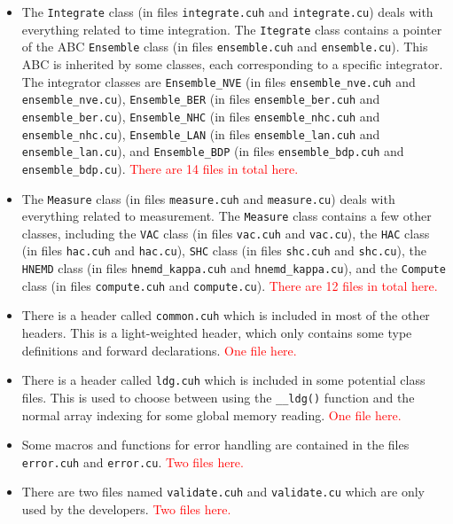 \documentclass[12pt,a4paper]{report}
\begin{document}
\begin{itemize}
\item The \verb"Integrate" class (in files \verb"integrate.cuh" and \verb"integrate.cu") deals with everything related to time integration. The \verb"Itegrate" class contains a pointer of the ABC \verb"Ensemble" class (in files \verb"ensemble.cuh" and \verb"ensemble.cu"). This ABC is inherited by some classes, each corresponding to a specific integrator. The integrator classes are \verb"Ensemble_NVE" (in files \verb"ensemble_nve.cuh" and \verb"ensemble_nve.cu"), \verb"Ensemble_BER" (in files \verb"ensemble_ber.cuh" and \verb"ensemble_ber.cu"), \verb"Ensemble_NHC" (in files \verb"ensemble_nhc.cuh" and \verb"ensemble_nhc.cu"), \verb"Ensemble_LAN" (in files \verb"ensemble_lan.cuh" and \verb"ensemble_lan.cu"), and \verb"Ensemble_BDP" (in files \verb"ensemble_bdp.cuh" and \verb"ensemble_bdp.cu").  \textcolor{red}{There are 14 files in total here.}

\item The \verb"Measure" class (in files \verb"measure.cuh" and \verb"measure.cu") deals with everything related to measurement. The \verb"Measure" class contains a few other classes, including the  \verb"VAC" class (in files \verb"vac.cuh" and \verb"vac.cu"), the \verb"HAC" class (in files \verb"hac.cuh" and \verb"hac.cu"), \verb"SHC" class (in files \verb"shc.cuh" and \verb"shc.cu"), the \verb"HNEMD" class (in files \verb"hnemd_kappa.cuh" and \verb"hnemd_kappa.cu"), and the \verb"Compute" class (in files \verb"compute.cuh" and \verb"compute.cu"). \textcolor{red}{There are 12 files in total here.}

\item There is a header called \verb"common.cuh" which is included in most of the other headers. This is a light-weighted header, which only contains some type definitions and forward declarations. \textcolor{red}{One file here.}

\item There is a header called \verb"ldg.cuh" which is included in some potential class files. This is used to choose between using the \verb"__ldg()" function and the normal array indexing for some global memory reading. \textcolor{red}{One file here.}

\item Some macros and functions for error handling are contained in the files \verb"error.cuh" and \verb"error.cu". \textcolor{red}{Two files here.}

\item There are two files named \verb"validate.cuh" and \verb"validate.cu" which are only used by the developers. \textcolor{red}{Two files here.}
\end{itemize}
\end{document}
